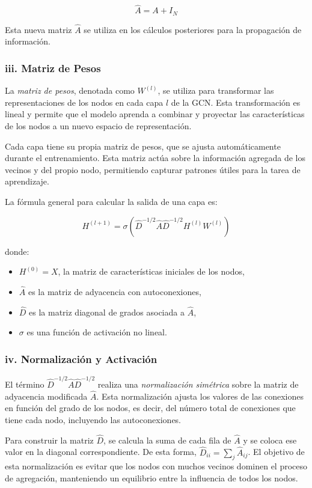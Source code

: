 \documentclass[11pt]{article} %
\begin{document}
\[
\hat{A} = A + I_N
\]

Esta nueva matriz $\hat{A}$ se utiliza en los cálculos posteriores para la propagación de información.


\subsubsection{iii. Matriz de Pesos}

La \textit{matriz de pesos}, denotada como $W^{(l)}$, se utiliza para transformar las representaciones de los nodos en cada capa $l$ de la GCN. Esta transformación es lineal y permite que el modelo aprenda a combinar y proyectar las características de los nodos a un nuevo espacio de representación.

Cada capa tiene su propia matriz de pesos, que se ajusta automáticamente durante el entrenamiento. Esta matriz actúa sobre la información agregada de los vecinos y del propio nodo, permitiendo capturar patrones útiles para la tarea de aprendizaje.

La fórmula general para calcular la salida de una capa es:

\[
H^{(l+1)} = \sigma\left( \hat{D}^{-1/2} \hat{A} \hat{D}^{-1/2} H^{(l)} W^{(l)} \right)
\]

donde:
\begin{itemize}
    \item $H^{(0)} = X$, la matriz de características iniciales de los nodos,
    \item $\hat{A}$ es la matriz de adyacencia con autoconexiones,
    \item $\hat{D}$ es la matriz diagonal de grados asociada a $\hat{A}$,
    \item $\sigma$ es una función de activación no lineal.
\end{itemize}

\subsubsection{iv. Normalización y Activación}

El término $\hat{D}^{-1/2} \hat{A} \hat{D}^{-1/2}$ realiza una \textit{normalización simétrica} sobre la matriz de adyacencia modificada $\hat{A}$. Esta normalización ajusta los valores de las conexiones en función del grado de los nodos, es decir, del número total de conexiones que tiene cada nodo, incluyendo las autoconexiones.

Para construir la matriz $\hat{D}$, se calcula la suma de cada fila de $\hat{A}$ y se coloca ese valor en la diagonal correspondiente. De esta forma, $\hat{D}_{ii} = \sum_j \hat{A}_{ij}$. El objetivo de esta normalización es evitar que los nodos con muchos vecinos dominen el proceso de agregación, manteniendo un equilibrio entre la influencia de todos los nodos.
\end{document}
